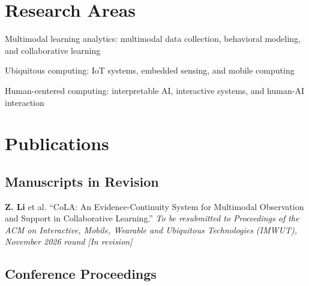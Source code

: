 \documentclass[11pt,letterpaper]{report}
\newcommand{\listitemspace}{0.25em}
\renewenvironment{itemize}
{\begin{list}{}{\setlength{\leftmargin}{0em}
                \setlength{\parskip}{0em}
                \setlength{\itemsep}{\listitemspace}
                \setlength{\parsep}{\listitemspace}}}
{\end{list}}
\begin{document}
    \section*{Research Areas}

    \begin{itemize}
        \item Multimodal learning analytics: multimodal data collection, behavioral modeling, and collaborative learning
        \item Ubiquitous computing: IoT systems, embedded sensing, and mobile computing
        \item Human-centered computing: interpretable AI, interactive systems, and human-AI interaction
    \end{itemize}    

    \section*{Publications}

    \subsection*{Manuscripts in Revision}

    \begin{tablist}
        \item[2026] \tab{} \textbf{Z. Li} et al. \enquote{CoLA: An Evidence-Continuity System for Multimodal Observation and Support in Collaborative Learning.} \textit{To be resubmitted to Proceedings of the ACM on Interactive, Mobile, Wearable and Ubiquitous Technologies (IMWUT), November 2026 round} \textit{[In revision]}
    \end{tablist}

    \subsection*{Conference Proceedings}
\end{document}
